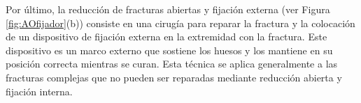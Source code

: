 Por \'ultimo, la reducci\'on de fracturas abiertas y fijaci\'on externa (ver Figura \ref{fig:AOfijador}(b)) consiste en una cirug\'ia para reparar la fractura y la colocaci\'on de un dispositivo de fijaci\'on externa en la extremidad con la fractura. Este dispositivo es un marco externo que sostiene los huesos y los mantiene en su posici\'on correcta mientras se curan. Esta t\'ecnica se aplica generalmente a las fracturas complejas que no pueden ser reparadas mediante reducci\'on abierta y fijaci\'on interna.

